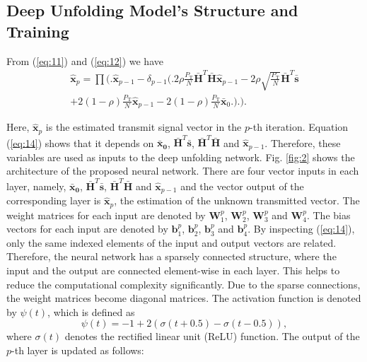 \documentclass[conference]{IEEEtran}
\begin{document}
\subsection{Deep Unfolding Model's Structure and Training}
From (\ref{eq:11}) and (\ref{eq:12}) we have
\begin{multline}
\boldsymbol{\hat{x}}_{p} =\prod \Bigg( \Bigg.\boldsymbol{\hat{x}}_{p-1} - \delta_{p-1} \Bigg( \Bigg.2\rho \frac{P_{\textrm{T}}}{N} \boldsymbol{\bar{H}}^T\boldsymbol{\bar{H}}\boldsymbol{\hat{x}}_{p-1} - 2\rho \sqrt{\frac{P_{\textrm{T}}}{N}} \boldsymbol{\bar{H}}^T\boldsymbol{\bar{s}}\\ + 2(1-\rho) \frac{P_{\textrm{T}}}{N} \boldsymbol{\hat{x}}_{p-1} - 2(1-\rho) \frac{P_{\textrm{T}}}{N} \boldsymbol{\bar{x}}_{\textrm{0}}\Bigg. \Bigg) \Bigg. \Bigg). \label{eq:14}
\end{multline}

%
%
Here, $\boldsymbol{\hat{x}}_{p}$ is the estimated transmit signal vector in the $p$-th iteration. Equation (\ref{eq:14}) shows that it depends on $\boldsymbol{\bar{x}_{0}}$, $\boldsymbol{\bar{H}}^T\boldsymbol{\bar{s}}$, $\boldsymbol{\bar{H}}^T\boldsymbol{\bar{H}}$ and $\boldsymbol{\hat{x}}_{p-1}$. Therefore, these variables are used as inputs to the deep unfolding network. Fig. \ref{fig:2} shows the architecture of the proposed neural network. There are four vector inputs in each layer, namely, $\boldsymbol{\bar{x}_{0}}$, $\boldsymbol{\bar{H}}^T\boldsymbol{\bar{s}}$, $\boldsymbol{\bar{H}}^T\boldsymbol{\bar{H}}$ and $\boldsymbol{\hat{x}}_{p-1}$ %
and the vector output of the corresponding layer is $\boldsymbol{\hat{x}}_{p}$, the estimation of the unknown transmitted vector. The weight matrices for each input are denoted by $\boldsymbol{W}_{1}^{p}$, $\boldsymbol{W}_{2}^{p}$, $\boldsymbol{W}_{3}^{p}$ and $\boldsymbol{W}_{4}^{p}$. The bias vectors for each input are denoted by $\boldsymbol{b}_{1}^{p}$, $\boldsymbol{b}_{2}^{p}$, $\boldsymbol{b}_{3}^{p}$ and $\boldsymbol{b}_{4}^{p}$. By inspecting (\ref{eq:14}), only the same indexed elements of the input and output vectors are related. Therefore, the neural network has a sparsely connected structure, where the input and the output are connected element-wise in each layer. This helps to reduce the computational complexity significantly. Due to the sparse connections, the weight matrices become diagonal matrices. The activation function is  denoted by $\psi(t)$, which is defined as
\begin{equation}
\psi(t) = -1 + 2(\sigma(t+0.5)-\sigma(t-0.5)),
\end{equation}
where $\sigma(t)$ denotes the rectified linear unit (ReLU) function.
The output of the $p$-th layer is updated as follows:
\end{document}
